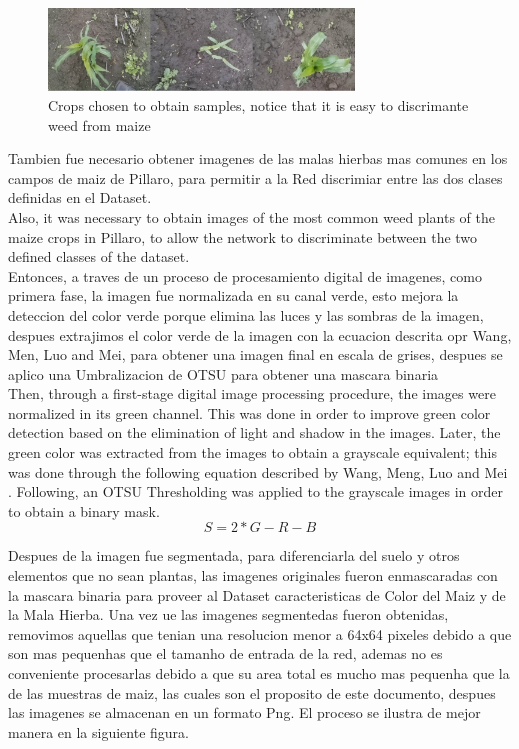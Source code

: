 \documentclass[conference]{IEEEtran}
\begin{document}
	\begin{figure}[h]
	\centering
	\includegraphics[width=3.2in]{entradamaiz}
	\caption{Crops chosen to obtain samples, notice that it is easy to discrimante weed from maize}
	\label{fig_sim}
	\end{figure}

Tambien fue necesario obtener imagenes de las malas hierbas mas comunes en los campos de maiz de Pillaro, para permitir a la Red discrimiar entre las dos clases definidas en el Dataset.\\

Also, it was necessary to obtain images of the most common weed plants of the maize crops in Pillaro, to allow the network to discriminate between the two defined classes of the dataset. \\

Entonces, a traves de un proceso de procesamiento digital de imagenes, como primera fase, la imagen fue normalizada en su canal verde, esto mejora la deteccion del color verde porque elimina las luces y las sombras de la imagen, despues extrajimos el color verde de la imagen con la ecuacion descrita opr Wang, Men, Luo and Mei, para obtener una imagen final en escala de grises, despues se aplico una Umbralizacion de OTSU para obtener una mascara binaria \\
	
Then, through a first-stage digital image processing procedure, the images were normalized in its green channel. This was done in order to improve green color detection based on the elimination of light and shadow in the images. Later, the green color was extracted from the images to obtain a grayscale equivalent; this was done through the following equation described by Wang, Meng, Luo and Mei \cite{wang2013path}. Following, an OTSU Thresholding was applied to the grayscale images in order to obtain a binary mask.  
\begin{equation}
	S = 2*G - R - B
\end{equation} 

Despues de la imagen fue segmentada, para diferenciarla del suelo y otros elementos que no sean plantas, las imagenes originales fueron enmascaradas con la mascara binaria para proveer al Dataset caracteristicas de Color del Maiz y de la Mala Hierba. Una vez ue las imagenes segmentedas fueron obtenidas, removimos aquellas que tenian una resolucion menor a 64x64 pixeles debido a que son mas pequenhas que el tamanho de entrada de la red, ademas no es conveniente procesarlas debido a que su area total es mucho mas pequenha que la de las muestras de maiz, las cuales son el proposito de este documento, despues las imagenes se almacenan en un formato Png. El proceso se ilustra de mejor manera en la siguiente figura. \\
\end{document}
